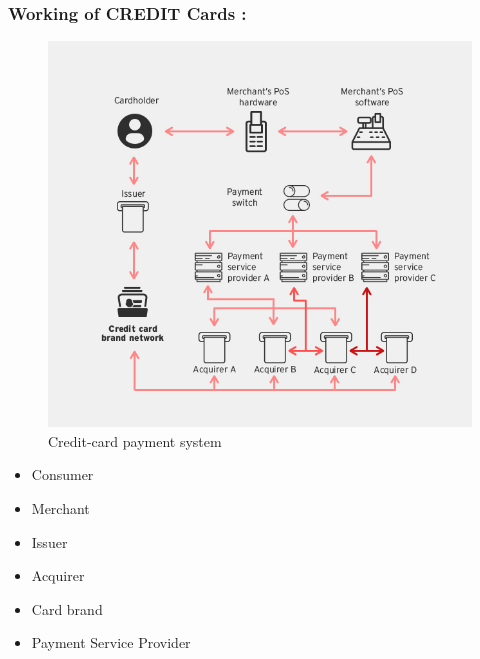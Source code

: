 \documentclass[handout]{beamer}
\begin{document}
\begin{frame}
\frametitle{Working of CREDIT Cards :} 
\begin{figure}[h]
\begin{center}
\includegraphics[scale=0.18,angle=360]{img2.jpg}
\caption{Credit-card payment system }
\end{center}
\end{figure}

\begin{itemize}
\item Consumer
\item Merchant
\item Issuer
\item Acquirer
\item Card brand
\item Payment Service Provider


\end{itemize}
\end{frame}
\end{document}
